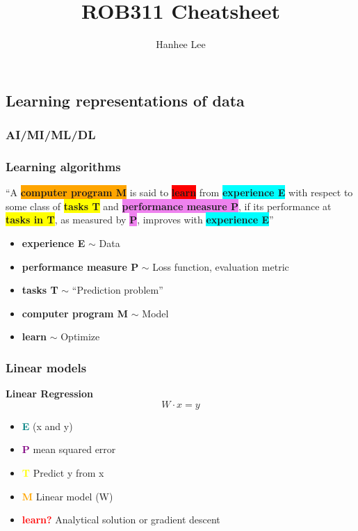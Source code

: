 \documentclass[twoside]{article}
\title{ROB311 Cheatsheet}
\author{Hanhee Lee}
\begin{document}
\subsection{Learning representations of data}
\subsubsection{AI/MI/ML/DL}
\begin{definition}
\end{definition}
\subsubsection{Learning algorithms}
\begin{definition}
    \textquotedblleft A \colorbox{orange}{\textbf{computer program M}} is said to \colorbox{red}{\textbf{learn}} from \colorbox{cyan}{\textbf{experience E}} with respect to some class of \colorbox{yellow}{\textbf{tasks T}} and \colorbox{violet}{\textbf{performance measure P}}, if its performance at \colorbox{yellow}{\textbf{tasks in T}}, as measured by \colorbox{violet}{\textbf{P}}, improves with \colorbox{cyan}{\textbf{experience E}}\textquotedblright

\vspace{1em}

\noindent
\begin{itemize}
    \item \textbf{\color{cyan}experience E} $\sim$ Data
    \item \textbf{\color{violet}performance measure P} $\sim$ Loss function, evaluation metric
    \item \textbf{\color{yellow}tasks T} $\sim$ ``Prediction problem''
    \item \textbf{\color{orange}computer program M} $\sim$ Model
    \item \textbf{\color{red}learn} $\sim$ Optimize
\end{itemize}

\end{definition}

\subsubsection{Linear models}
\begin{example} \textbf{Linear Regression}
    \begin{equation}
        W \cdot x = y
    \end{equation}
    \begin{itemize}
        \item \textcolor{teal}{\textbf{E}} (x and y)
        \item \textcolor{purple}{\textbf{P}} mean squared error
        \item \textcolor{yellow}{\textbf{T}} Predict y from x
        \item \textcolor{orange}{\textbf{M}} Linear model (W)
        \item \textcolor{red}{\textbf{learn?}} Analytical solution or gradient descent
    \end{itemize}
\end{example}
\end{document}
